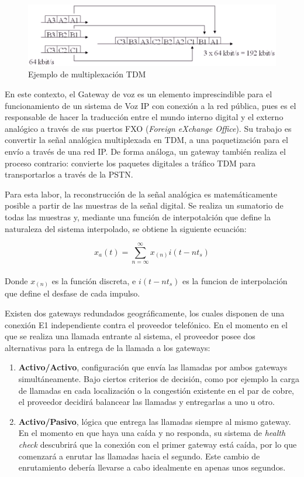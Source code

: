 \documentclass[a4paper, 12pt]{book}
\begin{document}
\begin{figure}
  \centering
  \includegraphics[scale=0.7]{img/fig_tdm}
  \caption{Ejemplo de multiplexación TDM}
  \label{figura:fig_tdm}
\end{figure}

En este contexto, el Gateway de voz es un elemento imprescindible para el funcionamiento de un sistema de Voz IP con conexión a la red pública, pues es el responsable de hacer la traducción entre el mundo interno digital y el externo analógico a través de sus puertos FXO (\emph{Foreign eXchange Office}). Su trabajo es convertir la señal analógica multiplexada en TDM, a una paquetización para el envío a través de una red IP. De forma análoga, un gateway también realiza el proceso contrario: convierte los paquetes digitales a tráfico TDM para transportarlos a través de la PSTN.

Para esta labor, la reconstrucción de la señal analógica es matemáticamente posible a partir de las muestras de la señal digital. Se realiza un sumatorio de todas las muestras y, mediante una función de interpotalción que define la naturaleza del sistema interpolado, se obtiene la siguiente ecuación:

\large
\[
  x_{a}(t) = \sum_{n=\infty}^\infty x_{(n)}i(t-nt_{s})
\]
\\
\normalsize
Donde $x_{(n)}$ es la función discreta, e $i(t-nt_{s})$ es la funcion de interpolación que define el desfase de cada impulso.

Existen dos gateways redundados geográficamente, los cuales disponen de una conexión E1 independiente contra el proveedor telefónico. En el momento en el que se realiza una llamada entrante al sistema, el proveedor posee dos alternativas para la entrega de la llamada a los gateways:

\begin{enumerate}
  \item \textbf{Activo/Activo}, configuración que envía las llamadas por ambos gateways simultáneamente. Bajo ciertos criterios de decisión, como por ejemplo la carga de llamadas en cada localización o la congestión existente en el par de cobre, el proveedor decidirá balancear las llamadas y entregarlas a uno u otro.
  \item \textbf{Activo/Pasivo}, lógica que entrega las llamadas siempre al mismo gateway. En el momento en que haya una caída y no responda, su sistema de \emph{health check} descubrirá que la conexión con el primer gateway está caída, por lo que comenzará a enrutar las llamadas hacia el segundo. Este cambio de enrutamiento debería llevarse a cabo idealmente en apenas unos segundos.
\end{enumerate}
\end{document}

